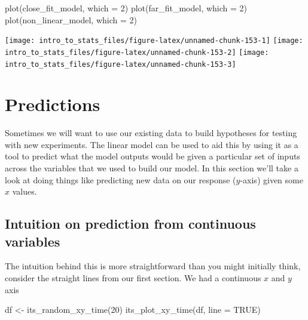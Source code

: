 \documentclass[
]{book}
\newenvironment{Shaded}{\begin{snugshade}}{\end{snugshade}}
\newcommand{\AttributeTok}[1]{\textcolor[rgb]{0.77,0.63,0.00}{#1}}
\newcommand{\ConstantTok}[1]{\textcolor[rgb]{0.00,0.00,0.00}{#1}}
\newcommand{\DecValTok}[1]{\textcolor[rgb]{0.00,0.00,0.81}{#1}}
\newcommand{\FunctionTok}[1]{\textcolor[rgb]{0.00,0.00,0.00}{#1}}
\newcommand{\NormalTok}[1]{#1}
\newcommand{\OtherTok}[1]{\textcolor[rgb]{0.56,0.35,0.01}{#1}}
\begin{document}
\begin{Shaded}
\begin{Highlighting}[]
\FunctionTok{plot}\NormalTok{(close\_fit\_model, }\AttributeTok{which =} \DecValTok{2}\NormalTok{)}
\FunctionTok{plot}\NormalTok{(far\_fit\_model, }\AttributeTok{which =} \DecValTok{2}\NormalTok{)}
\FunctionTok{plot}\NormalTok{(non\_linear\_model, }\AttributeTok{which =} \DecValTok{2}\NormalTok{)}
\end{Highlighting}
\end{Shaded}

\texttt{[image: intro\_to\_stats\_files/figure-latex/unnamed-chunk-153-1]} \texttt{[image: intro\_to\_stats\_files/figure-latex/unnamed-chunk-153-2]} \texttt{[image: intro\_to\_stats\_files/figure-latex/unnamed-chunk-153-3]}

\hypertarget{predictions}{%
\section{Predictions}\label{predictions}}

Sometimes we will want to use our existing data to build hypotheses for testing with new experiments. The linear model can be used to aid this by using it as a tool to predict what the model outputs would be given a particular set of inputs across the variables that we used to build our model. In this section we'll take a look at doing things like predicting new data on our response (\(y\)-axis) given some \(x\) values.

\hypertarget{intuition-on-prediction-from-continuous-variables}{%
\subsection{Intuition on prediction from continuous variables}\label{intuition-on-prediction-from-continuous-variables}}

The intuition behind this is more straightforward than you might initially think, consider the straight lines from our first section. We had a continuous \(x\) and \(y\) axis

\begin{Shaded}
\begin{Highlighting}[]
\NormalTok{df }\OtherTok{\textless{}{-}} \FunctionTok{its\_random\_xy\_time}\NormalTok{(}\DecValTok{20}\NormalTok{)}
\FunctionTok{its\_plot\_xy\_time}\NormalTok{(df, }\AttributeTok{line =} \ConstantTok{TRUE}\NormalTok{)}
\end{Highlighting}
\end{Shaded}
\end{document}
